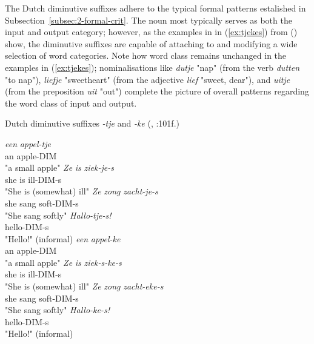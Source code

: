 The Dutch diminutive suffixes adhere to the typical formal patterns estalished in Subsection~\ref{subsec:2-formal-crit}. The noun most typically serves as both the input and output category; however, as the examples in in (\ref{ex:tjekes}) from \citeauthor{DeBelder+2022} (\citeyear{DeBelder+2022}) show, the diminutive suffixes are capable of attaching to and modifying a wide selection of word categories. Note how word class remains unchanged in the examples in (\ref{ex:tjekes}); nominalisations like \textit{dutje} "nap" (from the verb \textit{dutten} "to nap"), \textit{liefje} "sweetheart" (from the adjective \textit{lief} "sweet, dear"), and \textit{uitje} (from the preposition \textit{uit} "out") complete the picture of overall patterns regarding the word class of input and output.

\begin{exe}
\ex \label{ex:tjekes}
Dutch diminutive suffixes \textit{-tje} and \textit{-ke} (\citeauthor{DeBelder+2022}, \citeyear{DeBelder+2022}:101f.)
\begin{multicols}{2}
\begin{xlist}
\ex \label{ex:tjesnoun} \gll
\textit{een} \textit{appel-tje} \\
an apple-DIM \\
\trans "a small apple"
\ex \label{ex:tjesadj} \gll
\textit{Ze} \textit{is} \textit{ziek-je-s} \\
she is ill-DIM-s \\
\trans "She is (somewhat) ill"
\ex \label{ex:tjesadv} \gll
\textit{Ze} \textit{zong} \textit{zacht-je-s} \\
she sang soft-DIM-s \\
\trans "She sang softly"
\ex \label{ex:tjesinterj} \gll
\textit{Hallo-tje-s!} \\
hello-DIM-s \\
\trans "Hello!" (informal)
\columnbreak
\ex \label{ex:kesnoun} \gll
\textit{een} \textit{appel-ke} \\
an apple-DIM \\
\trans "a small apple"
\ex \label{ex:kesadj} \gll
\textit{Ze} \textit{is} \textit{ziek-s-ke-s} \\
she is ill-DIM-s \\
\trans "She is (somewhat) ill"
\ex \label{ex:kesadv} \gll
\textit{Ze} \textit{zong} \textit{zacht-eke-s} \\
she sang soft-DIM-s \\
\trans "She sang softly"
\ex \label{ex:kesinterj} \gll
\textit{Hallo-ke-s!} \\
hello-DIM-s \\
\trans "Hello!" (informal)
\end{xlist}
\end{multicols}
\end{exe}

